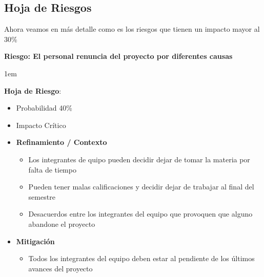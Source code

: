 \documentclass[12pt, fleqn]{report}                             %
\newenvironment{SmallIndentation}[1][0.75em]                    %
    {\begin{adjustwidth}{#1}{}\begin{footnotesize}}                 %
    {\end{footnotesize}\end{adjustwidth}}                           %
\begin{document}
        \subsection{Hoja de Riesgos}


            Ahora veamos en más detalle como es los riesgos
            que tienen un impacto mayor al 30\%


            \textbf{Riesgo: El personal renuncia del proyecto por
            diferentes causas}

                \begin{SmallIndentation}[1em]
                    \textbf{Hoja de Riesgo}:
                    
                    \begin{itemize}
                        \item Probabilidad 40\%
                        \item Impacto Crítico
                        \item
                            \textbf{Refinamiento / Contexto}
                            \begin{itemize}
                                \item 
                                    Los integrantes de quipo pueden
                                    decidir dejar de tomar la materia por falta
                                    de tiempo

                                \item
                                    Pueden tener malas calificaciones y decidir
                                    dejar de trabajar al final del semestre

                                \item
                                    Desacuerdos entre los integrantes del 
                                    equipo que provoquen que alguno abandone
                                    el proyecto 
                            \end{itemize}
                        \item
                            \textbf{Mitigación}
                            \begin{itemize}
                                \item 
                                    Todos los integrantes del equipo deben
                                    estar al pendiente de los últimos avances
                                    del proyecto


\end{itemize}
\end{itemize}
\end{SmallIndentation}
\end{document}
